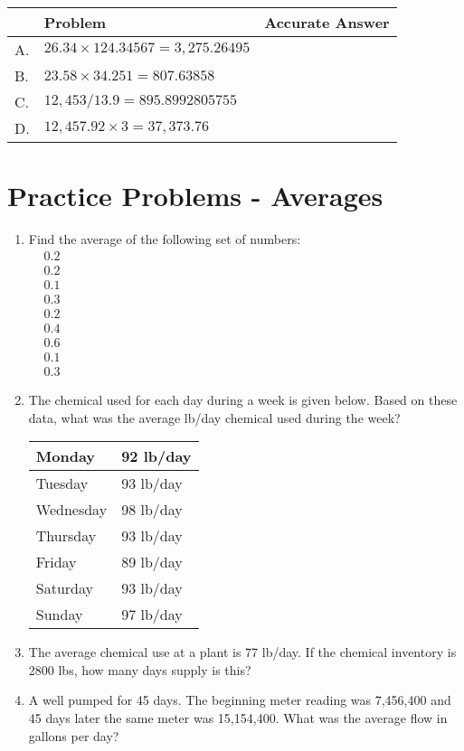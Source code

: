 \begin{tabular}{|l|l|l|}
\hline
 & Problem & Accurate Answer \\
\hline
A. & $26.34 \times 124.34567=3,275.26495$ &  \\
\hline
B. & $23.58 \times 34.251=807.63858$ &  \\
\hline
C. & $12,453 / 13.9=895.8992805755$ &  \\
\hline
D. & $12,457.92 \times 3=37,373.76$ &  \\
\hline
\end{tabular}

\section*{Practice Problems - Averages}
\begin{enumerate}

\item Find the average of the following set of numbers:\\
$
\begin{aligned}
&0.2 \\
&0.2 \\
&0.1 \\
&0.3 \\
&0.2 \\
&0.4 \\
&0.6 \\
&0.1 \\
&0.3
\end{aligned}
$

\item The chemical used for each day during a week is given below. Based on these data, what was the average lb/day chemical used during the week?\\

\begin{tabular}{|l|l|}
\hline
Monday & 92 lb/day\\
\hline
Tuesday & 93 lb/day \\
\hline
Wednesday & 98 lb/day\\
\hline
Thursday & 93 lb/day \\
\hline
Friday & 89 lb/day\\
\hline
Saturday & 93 lb/day \\
\hline
Sunday & 97 lb/day\\
\hline
\end{tabular}

\item The average chemical use at a plant is 77 lb/day. If the chemical inventory is 2800 lbs, how many days supply is this?

\item A well pumped for 45 days. The beginning meter reading was 7,456,400 and 45 days later the same meter was 15,154,400. What was the average flow in gallons per day?

\vspace{1cm}
\end{enumerate}
